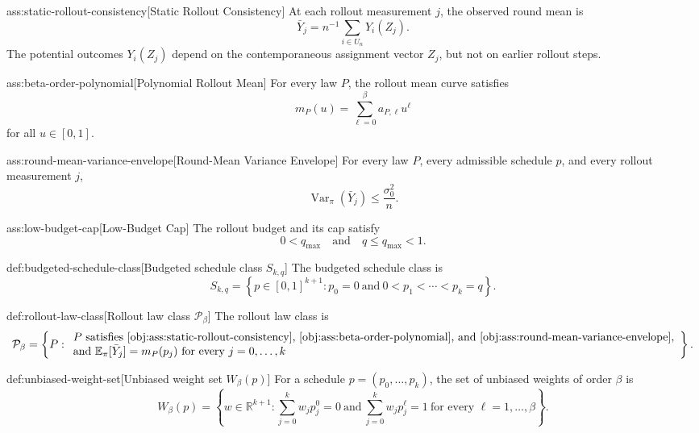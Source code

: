 \begin{assumptionv}{ass:static-rollout-consistency}[Static Rollout Consistency]
At each rollout measurement \(j\), the observed round mean is
\[
\bar Y_j
=
n^{-1}\sum_{i\in U_n} Y_i(Z_j).
\]
The potential outcomes \(Y_i(Z_j)\) depend on the contemporaneous assignment vector \(Z_j\), but not on earlier rollout steps.
\end{assumptionv}

\begin{assumptionv}{ass:beta-order-polynomial}[Polynomial Rollout Mean]
For every law \(P\), the rollout mean curve satisfies
\[
m_P(u)=\sum_{\ell=0}^{\beta} a_{P,\ell}u^\ell
\]
for all \(u\in[0,1]\).
\end{assumptionv}

\begin{assumptionv}{ass:round-mean-variance-envelope}[Round-Mean Variance Envelope]
For every law \(P\), every admissible schedule \(p\), and every rollout measurement \(j\),
\[
\operatorname{Var}_\pi(\bar Y_j)\le \frac{\sigma_0^2}{n}.
\]
\end{assumptionv}

\begin{assumptionv}{ass:low-budget-cap}[Low-Budget Cap]
The rollout budget and its cap satisfy
\[
0<q_{\max}\quad\text{and}\quad q\le q_{\max}<1.
\]
\end{assumptionv}

\begin{definitionv}{def:budgeted-schedule-class}[Budgeted schedule class \(S_{k,q}\)]
The budgeted schedule class is
\[
S_{k,q}
=
\left\{
p\in[0,1]^{k+1}:
p_0=0
\ \text{and}\
0<p_1<\cdots<p_k=q
\right\}.
\]
\end{definitionv}

\begin{definitionv}{def:rollout-law-class}[Rollout law class \(\mathcal P_\beta\)]
The rollout law class is
\[
\mathcal P_\beta
=
\left\{
P:
\begin{array}{l}
P \text{ satisfies \cref{obj:ass:static-rollout-consistency}, \cref{obj:ass:beta-order-polynomial}, and \cref{obj:ass:round-mean-variance-envelope}},\\
\text{and } \mathbb E_\pi[\bar Y_j]=m_P(p_j) \text{ for every } j=0,\ldots,k
\end{array}
\right\}.
\]
\end{definitionv}

\begin{definitionv}{def:unbiased-weight-set}[Unbiased weight set $W_\beta(p)$]
For a schedule \(p=(p_0,\ldots,p_k)\), the set of unbiased weights of order \(\beta\) is
\[
W_\beta(p)
=
\left\{
w\in\mathbb R^{k+1}:
\sum_{j=0}^k w_j p_j^0=0
\ \text{and}\
\sum_{j=0}^k w_j p_j^\ell=1
\ \text{for every } \ell=1,\ldots,\beta
\right\}.
\]
\end{definitionv}

